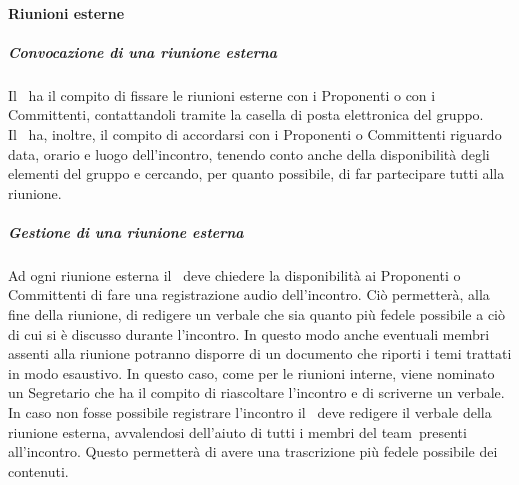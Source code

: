 \documentclass[../NormeProgetto.tex]{subfiles}
\begin{document}
			\paragraph{Riunioni esterne}
			\subparagraph{Convocazione di una riunione esterna}
			Il \responsabilediprogetto\ ha il compito di fissare le riunioni esterne con i Proponenti o con i Committenti, contattandoli tramite la casella di posta elettronica del gruppo.\\ Il \responsabilediprogetto\ ha, inoltre, il compito di accordarsi con i Proponenti o Committenti riguardo data, orario e luogo dell'incontro, tenendo conto anche della disponibilità degli elementi del gruppo e cercando, per quanto possibile, di far partecipare tutti alla riunione.
			\subparagraph{Gestione di una riunione esterna}
			Ad ogni riunione esterna il \responsabilediprogetto\ deve chiedere la disponibilità ai Proponenti o Committenti di fare una registrazione audio dell'incontro. Ciò permetterà, alla fine della riunione, di redigere un verbale che sia quanto più fedele possibile a ciò di cui si è discusso durante l'incontro. In questo modo anche eventuali membri assenti alla riunione potranno disporre di un documento che riporti i temi trattati in modo esaustivo. In questo caso, come per le riunioni interne, viene nominato un Segretario che ha il compito di riascoltare l'incontro e di scriverne un verbale. In caso non fosse possibile registrare l'incontro il \responsabilediprogetto\ deve redigere il verbale della riunione esterna, avvalendosi dell'aiuto di tutti i membri del team\g\ presenti all'incontro. Questo permetterà di avere una trascrizione più fedele possibile dei contenuti.
\end{document}
